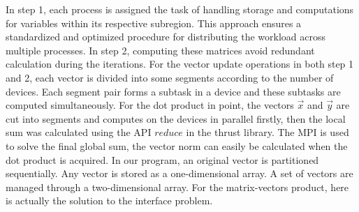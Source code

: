  In step 1, each process is assigned the task of handling storage and computations for variables within its respective subregion. This approach ensures a standardized and optimized procedure for distributing the workload across multiple processes. In step 2, computing these matrices avoid redundant calculation during the iterations. For the vector update operations in both step 1 and 2, each vector is divided into some segments according to the number of devices. Each segment pair forms a subtask in a device and these subtasks are computed simultaneously. For the dot product in point, the vectors $\vec{x}$ and $\vec{y}$ are cut into segments and computes on the devices in parallel firstly, then the local sum was calculated using the API $reduce$ in the thrust library. The MPI is used to solve the final global sum, the vector norm can easily be calculated when the dot product is acquired. In our program, an original vector is partitioned sequentially. Any vector is stored as a one-dimensional array. A set of vectors are managed through a two-dimensional array. For the matrix-vectors product, here is actually the solution to the interface problem.


